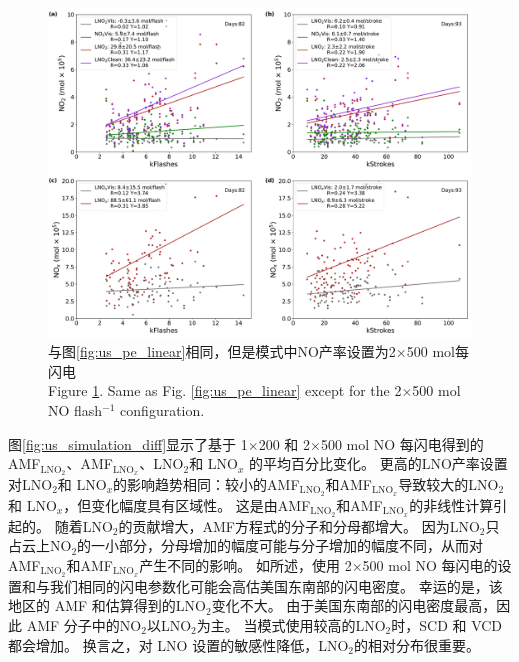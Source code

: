 \begin{figure}[!htbp]
\centering
\includegraphics[width=15cm]{./figures/us_pe_linear_2x500.pdf}
\caption{与图\ref{fig:us_pe_linear}相同，但是模式中NO产率设置为2$\times$500 mol每闪电 \\Figure \ref{fig:us_pe_linear_2x500}. Same as Fig. \ref{fig:us_pe_linear} except for the 2$\times$500 mol NO flash$^{-1}$ configuration.}
\label{fig:us_pe_linear_2x500}
\end{figure}

图\ref{fig:us_simulation_diff}显示了基于 1$\times$200 和 2$\times$500 mol NO 每闪电得到的AMF$_\textrm{LNO$_2$}$、AMF$_\textrm{LNO$_x$}$、LNO$_2$和 LNO$_x$ 的平均百分比变化。
更高的LNO产率设置对LNO$_2$和 LNO$_x$的影响趋势相同：较小的AMF$_\textrm{LNO$_2$}$和AMF$_\textrm{LNO$_x$}$导致较大的LNO$_2$和 LNO$_x$，但变化幅度具有区域性。
这是由AMF$_\textrm{LNO$_2$}$和AMF$_\textrm{LNO$_x$}$的非线性计算引起的。
随着LNO$_2$的贡献增大，AMF方程式的分子和分母都增大。
因为LNO$_2$只占云上NO$_2$的一小部分，分母增加的幅度可能与分子增加的幅度不同，从而对AMF$_\textrm{LNO$_2$}$和AMF$_\textrm{LNO$_x$}$产生不同的影响。
如\citet{Zhu.2019}所述，使用 2$\times$500 mol NO 每闪电的设置和与我们相同的闪电参数化可能会高估美国东南部的闪电密度。
幸运的是，该地区的 AMF 和估算得到的LNO$_2$变化不大。
由于美国东南部的闪电密度最高，因此 AMF 分子中的NO$_2$以LNO$_2$为主。
当模式使用较高的LNO$_2$时，SCD 和 VCD 都会增加。
换言之，对 LNO 设置的敏感性降低，LNO$_2$的相对分布很重要。

